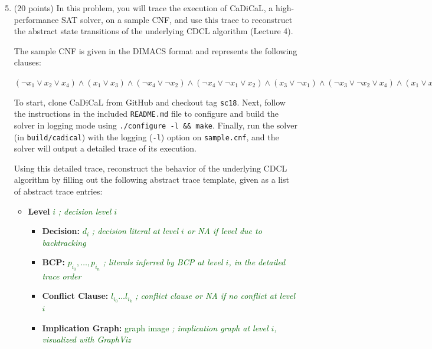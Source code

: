 \documentclass{article}
\begin{document}
\begin{enumerate}
	\setcounter{enumi}{4}

	\item (20 points) In this problem, you will trace the execution of CaDiCaL, a high-performance SAT solver, on a sample CNF, and use this trace to reconstruct the abstract state transitions of the underlying CDCL algorithm (Lecture 4).

	The sample CNF is given in the DIMACS format and represents the following clauses:
	\begin{center}
		$(\neg x_1 \lor x_2 \lor x_4) \wedge (x_1 \lor x_3)  \wedge (\neg x_4 \lor \neg x_2) \wedge (\neg x_4 \lor \neg x_1 \lor x_2)  \wedge (x_3 \lor \neg x_1)  \wedge (\neg x_3 \lor \neg x_2 \lor x_4) \wedge (x_1 \lor x_4) \wedge (\neg x_2 \lor x_1)$
	\end{center}

	To start, clone CaDiCaL from GitHub and checkout tag \texttt{sc18}. Next, follow the instructions in the included \texttt{README.md} file to configure and build the solver in logging mode using \texttt{./configure -l \&\& make}. Finally, run the solver (in \texttt{build/cadical}) with the logging (\texttt{-l}) option on \texttt{sample.cnf}, and the solver will output a detailed trace of its execution.

	Using this detailed trace, reconstruct the behavior of the underlying CDCL algorithm by filling out the following abstract trace template, given as a list of abstract trace entries:

	\begin{itemize}
		\item \textbf{Level} \textcolor{DarkGreen}{$i$}  \hfill{\textcolor{DarkGreen}{\emph{; decision level $i$}}}
		\begin{itemize}
			\item \textbf{Decision:} \textcolor{DarkGreen}{$d_i$}  \hfill{\textcolor{DarkGreen}{\emph{; decision literal at level $i$ or NA if level due to backtracking}}}
			\item \textbf{BCP:} \textcolor{DarkGreen}{$p_{i_0}, \ldots, p_{i_n}$} \hfill{\textcolor{DarkGreen}{\emph{; literals inferred by BCP at level $i$, in the detailed trace order}}}
			\item \textbf{Conflict Clause:}  \textcolor{DarkGreen}{$l_{i_0} \ldots l_{i_k}$} \hfill{\textcolor{DarkGreen}{\emph{; conflict clause or NA if no conflict at level $i$}}}

			\item \textbf{Implication Graph:} \textcolor{DarkGreen}{graph image} \hfill{\textcolor{DarkGreen}{\emph{; implication graph at level $i$, visualized with GraphViz}}}


\end{itemize}
\end{itemize}
\end{enumerate}
\end{document}
